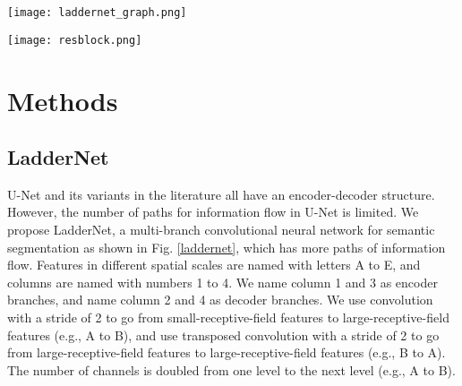 \documentclass{article}
\begin{document}
\begin{figure*}[!htb]
    \centering
    \begin{minipage}{.7\textwidth}
        \centering
        \texttt{[image: laddernet\_graph.png]}
    \end{minipage}\begin{minipage}{0.3\textwidth}
        \centering
        \texttt{[image: resblock.png]}
    \end{minipage}
    \caption{
    \footnotesize{From left to right: Structure of LadderNet and shared-weights residual block.}
    }
    \label{laddernet}
\end{figure*} 
\vspace{-0.2cm}
\section{Methods}
\vspace{-0.2cm}
\subsection{LadderNet}
U-Net and its variants in the literature all have an encoder-decoder structure. However, the number of paths for information flow in U-Net is limited. We propose LadderNet, a multi-branch convolutional neural network for semantic segmentation as shown in Fig. \ref{laddernet}, which has more paths of information flow. Features in different spatial scales are named with letters A to E, and columns are named with numbers 1 to 4. We name column 1 and 3 as encoder branches, and name column 2 and 4 as decoder branches. We use convolution with a stride of 2 to go from small-receptive-field features to large-receptive-field features (e.g., A to B), and use transposed convolution with a stride of 2 to go from large-receptive-field features to large-receptive-field features (e.g., B to A). The number of channels is doubled from one level to the next level (e.g., A to B). 
\vspace{-0.1cm}
\end{document}
